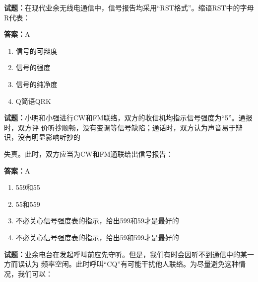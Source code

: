 \documentclass{ctexbook}
\begin{document}




\vspace{1em}

\textbf{试题：}在现代业余无线电通信中，信号报告均采用“RST格式”。缩语RST中的字母R代表： 

\textbf{答案：}A 

\begin{enumerate}[leftmargin=3em]
  \item 信号的可辩度 

  \item 信号的强度 

  \item 信号的纯净度 

  \item Q简语QRK 

\end{enumerate}





\vspace{1em}

\textbf{试题：}小明和小强进行CW和FM联络，双方的收信机均指示信号强度为“5”。通报时，双方评
价听抄顺畅，没有变调等信号缺陷；通话时，双方认为声音易于辩识，没有明显影响听抄的


失真。此时，双方应当为CW和FM通联给出信号报告： 

\textbf{答案：}A 

\begin{enumerate}[leftmargin=3em]
  \item 559和55 

  \item 55和559 

  \item 不必关心信号强度表的指示，给出599和59才是最好的 

  \item 不必关心信号强度表的指示，给出59和599才是最好的 

\end{enumerate}





\vspace{1em}

\textbf{试题：}业余电台在发起呼叫前应先守听。但是，我们有时会因听不到通信中的某一方而误认为
频率空闲。此时呼叫“CQ”有可能干扰他人联络。为尽量避免这种情况，我们可以： 
\end{document}
